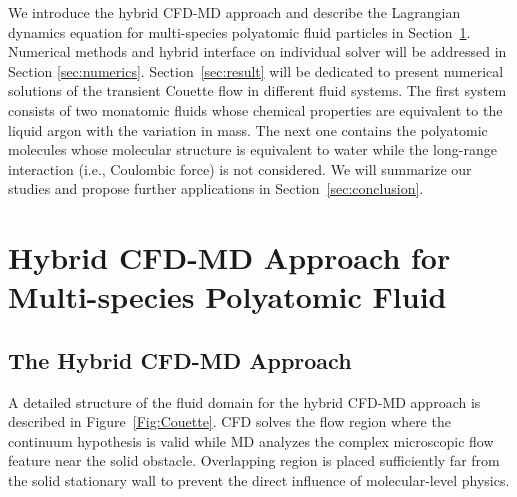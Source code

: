 \documentclass[]{aiaa-tc}%
\begin{document}
We introduce the hybrid CFD-MD approach and describe the Lagrangian dynamics equation
for multi-species polyatomic fluid particles in Section~\ref{sec:hybrid}. Numerical
methods and hybrid interface on individual solver will be addressed in Section
\ref{sec:numerics}. Section~\ref{sec:result} will be dedicated to present 
numerical solutions of the transient Couette flow in different fluid systems.
The first system consists of two monatomic fluids whose chemical properties are
equivalent to the liquid argon with the variation in mass. The next one contains
the polyatomic molecules whose molecular structure is equivalent to water while
the long-range interaction (i.e., Coulombic force) is not considered. We will 
summarize our studies and propose further applications in Section~\ref{sec:conclusion}.


\section{Hybrid CFD-MD Approach for Multi-species Polyatomic Fluid}
\label{sec:hybrid}

\subsection{The Hybrid CFD-MD Approach}
\label{sec:hybrid_design}


A detailed structure of the fluid domain for the hybrid CFD-MD approach is
described in Figure~\ref{Fig:Couette}. CFD solves the flow region where 
the continuum hypothesis is valid while MD analyzes the complex microscopic 
flow feature near the solid obstacle. Overlapping region is placed sufficiently 
far from the solid stationary wall to prevent the direct influence of 
molecular-level physics.
\end{document}
